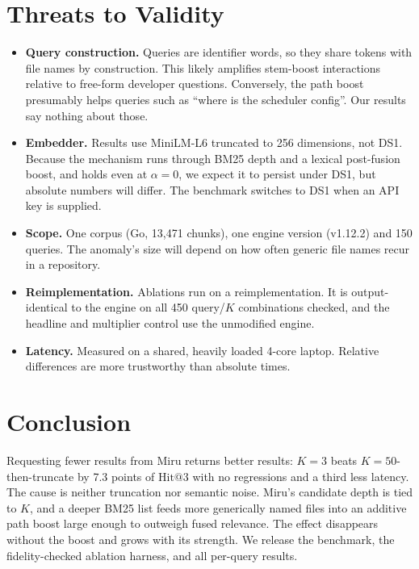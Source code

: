 \documentclass[11pt, letterpaper]{article}
\makeatletter
\newcommand{\hit}{\mathrm{Hit@3}}
\makeatother
\begin{document}
\section{Threats to Validity}
\begin{itemize}
  \item \textbf{Query construction.} Queries are identifier words, so they share tokens with file names by
        construction. This likely amplifies stem-boost interactions relative to free-form developer questions.
        Conversely, the path boost presumably helps queries such as ``where is the scheduler config''. Our results
        say nothing about those.
  \item \textbf{Embedder.} Results use MiniLM-L6 truncated to 256 dimensions, not DS1. Because the mechanism runs
        through BM25 depth and a lexical post-fusion boost, and holds even at $\alpha{=}0$, we expect it to persist
        under DS1, but absolute numbers will differ. The benchmark switches to DS1 when an API key is supplied.
  \item \textbf{Scope.} One corpus (Go, 13{,}471 chunks), one engine version (v1.12.2) and 150 queries. The
        anomaly's size will depend on how often generic file names recur in a repository.
  \item \textbf{Reimplementation.} Ablations run on a reimplementation. It is output-identical to the engine on all
        450 query/$K$ combinations checked, and the headline and multiplier control use the unmodified engine.
  \item \textbf{Latency.} Measured on a shared, heavily loaded 4-core laptop. Relative differences are more
        trustworthy than absolute times.
\end{itemize}

\section{Conclusion}
Requesting fewer results from Miru returns better results: $K{=}3$ beats $K{=}50$-then-truncate by 7.3 points of
$\hit$ with no regressions and a third less latency. The cause is neither truncation nor semantic noise. Miru's
candidate depth is tied to $K$, and a deeper BM25 list feeds more generically named files into an additive path boost
large enough to outweigh fused relevance. The effect disappears without the boost and grows with its strength. We
release the benchmark, the fidelity-checked ablation harness, and all per-query results.
\end{document}
